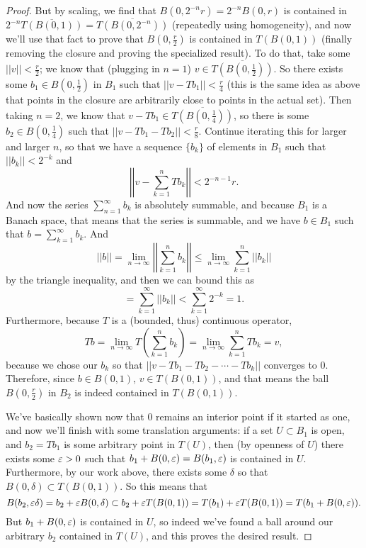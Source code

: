 \begin{proof}
But by scaling, we find that $B(0, 2^{-n}r) = 2^{-n}B(0, r)$ is contained in $2^{-n} \overline{T(B(0, 1))} = \overline{T(B(0, 2^{-n}))}$ (repeatedly using homogeneity), and now we'll use that fact to prove that $B(0, \frac{r}{2})$ is contained in $T(B(0, 1))$ (finally removing the closure and proving the specialized result). To do that, take some $||v|| < \frac{r}{2}$; we know that (plugging in $n=1$) $v \in \overline{T(B(0, \frac{1}{2}))}$. So there exists some $b_1 \in B(0, \frac{1}{2})$ in $B_1$ such that $||v - Tb_1|| < \frac{r}{4}$ (this is the same idea as above that points in the closure are arbitrarily close to points in the actual set). Then taking $n = 2$, we know that $v - Tb_1 \in \overline{T(B(0, \frac{1}{4}))}$, so there is some $b_2 \in B(0, \frac{1}{4})$ such that $||v - Tb_1 - Tb_2|| < \frac{r}{8}$. Continue iterating this for larger and larger $n$, so that we have a sequence $\{b_k\}$ of elements in $B_1$ such that $||b_k|| < 2^{-k}$ and 
\[
    \left|\left|v - \sum_{k=1}^n Tb_k\right|\right| < 2^{-n-1}r.
\]
And now the series $\sum_{n=1}^{\infty} b_k$ is absolutely summable, and because $B_1$ is a Banach space, that means that the series is summable, and we have $b \in B_1$ such that $b = \sum_{k=1}^{\infty} b_k$. And 
\[
    ||b|| = \lim_{n \to \infty} \left|\left|\sum_{k=1}^n b_k\right|\right| \le \lim_{n \to \infty} \sum_{k=1}^n ||b_k||
\]
by the triangle inequality, and then we can bound this as 
\[
    = \sum_{k=1}^{\infty} ||b_k|| < \sum_{k=1}^{\infty} 2^{-k} = 1.
\]
Furthermore, because $T$ is a (bounded, thus) continuous operator, 
\[
    Tb = \lim_{n \to \infty} T\left(\sum_{k=1}^n b_k\right) = \lim_{n \to \infty} \sum_{k=1}^n Tb_k = v,
\]
because we chose our $b_k$ so that $||v - Tb_1 - Tb_2 - \cdots - Tb_k||$ converges to $0$. Therefore, since $b \in B(0, 1)$, $v \in T(B(0, 1))$, and that means the ball $B(0, \frac{r}{2})$ in $B_2$ is indeed contained in $T(B(0, 1))$.

We've basically shown now that $0$ remains an interior point if it started as one, and now we'll finish with some translation arguments: if a set $U \subset B_1$ is open, and $b_2 = Tb_1$ is some arbitrary point in $T(U)$, then (by openness of $U$) there exists some $\varepsilon > 0$ such that $b_1 + B(0, \varepsilon) = B(b_1, \varepsilon)$ is contained in $U$. Furthermore, by our work above, there exists some $\delta$ so that $B(0, \delta) \subset T(B(0, 1))$. So this means that 
\[
    B(b_2, \varepsilon \delta) = b_2 + \varepsilon B(0, \delta) \subset b_2 + \varepsilon T(B(0, 1)) = T(b_1) + \varepsilon T(B(0, 1)) = T(b_1 + B(0, \varepsilon)).
\]
But $b_1 + B(0, \varepsilon)$ is contained in $U$, so indeed we've found a ball around our arbitrary $b_2$ contained in $T(U)$, and this proves the desired result.
\end{proof}

